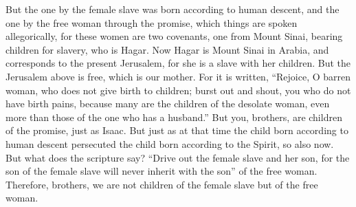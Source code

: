 \begin{biblechapter}
\verse But the one by the female slave was born according to human descent, and the one by the free woman through the promise,
\verse which things are spoken allegorically, for these women are two covenants, one from Mount Sinai, bearing children for slavery, who is Hagar.
\verse Now Hagar is Mount Sinai in Arabia, and corresponds to the present Jerusalem, for she is a slave with her children.
\verse But the Jerusalem above is free, which is our mother.
\verse For it is written, “Rejoice, O barren woman, who does not give birth to children; 
burst out and shout, you who do not have birth pains, 
because many are the children of the desolate woman, 
even more than those of the one who has a husband.”
\verse But you, brothers, are children of the promise, just as Isaac.
\verse But just as at that time the child born according to human descent persecuted the child born according to the Spirit, so also now.
\verse But what does the scripture say? “Drive out the female slave and her son, for the son of the female slave will never inherit with the son” of the free woman.
\verse Therefore, brothers, we are not children of the female slave but of the free woman.
\end{biblechapter}

